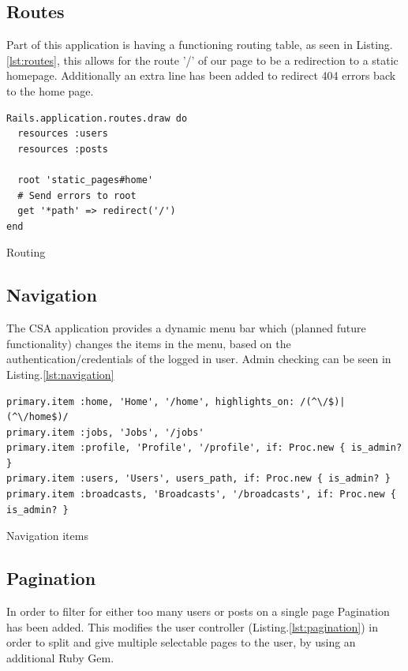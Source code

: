 \documentclass[a4paper]{article}
\begin{document}
\subsection{Routes}
\label{sec-1-3}
Part of this application is having a functioning routing table, as seen in  Listing.\ref{lst:routes}, 
this allows for the route '/' of our page to be a redirection to a static homepage. Additionally 
an extra line has been added to redirect 404 errors back to the home page.

\begin{listing}[H]
\begin{verbatim}
Rails.application.routes.draw do
  resources :users
  resources :posts

  root 'static_pages#home'
  # Send errors to root
  get '*path' => redirect('/')
end
\end{verbatim}
\caption{\label{lst:routes}Routing}
\end{listing}

\subsection{Navigation}
\label{sec-1-4}
The CSA application provides a dynamic menu bar which (planned future functionality) changes the items
in the menu, based on the authentication/credentials of the logged in user. Admin checking can be seen
 in Listing.\ref{lst:navigation}

\begin{listing}[H]
\begin{verbatim}
primary.item :home, 'Home', '/home', highlights_on: /(^\/$)|(^\/home$)/
primary.item :jobs, 'Jobs', '/jobs'
primary.item :profile, 'Profile', '/profile', if: Proc.new { is_admin? }
primary.item :users, 'Users', users_path, if: Proc.new { is_admin? }
primary.item :broadcasts, 'Broadcasts', '/broadcasts', if: Proc.new { is_admin? }
\end{verbatim}
\caption{\label{lst:navigation}Navigation items}
\end{listing}

\subsection{Pagination}
\label{sec-1-5}
In order to filter for either too many users or posts on a single page Pagination has been added. 
This modifies the user controller (Listing.\ref{lst:pagination}) in order to split and give multiple 
selectable pages to the user, by using an additional Ruby Gem.
\end{document}
